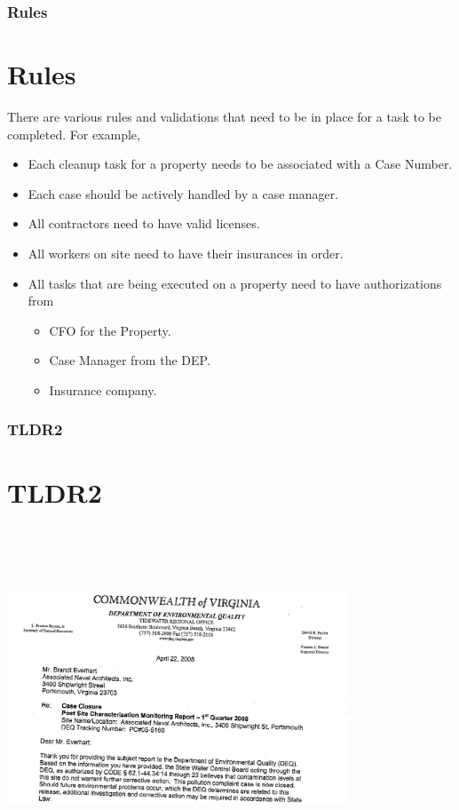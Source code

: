 \documentclass{beamer}
\begin{document}
\begin{frame}

\frametitle{Rules}
\section{Rules}
  There are various rules and validations that need to be in place for a task to be completed. For example, 
    \begin{itemize}
        \item Each cleanup task for a property needs to be associated with a Case Number. 
        \item Each case should be actively handled by a case manager.
        \item All contractors need to have valid licenses.
        \item All workers on site need to have their insurances in order.
        \item All tasks that are being executed on a property need to have authorizations from
          \begin{itemize}
            \item CFO for the Property.
            \item Case Manager from the DEP.
            \item Insurance company. 
          \end{itemize}
    \end{itemize}
\end{frame}

\begin{frame}
\frametitle{TLDR2}
\section {TLDR2}
  \includegraphics[width = 4in, height = 4in]{vadeqnfa}
\end{frame}
\end{document}
